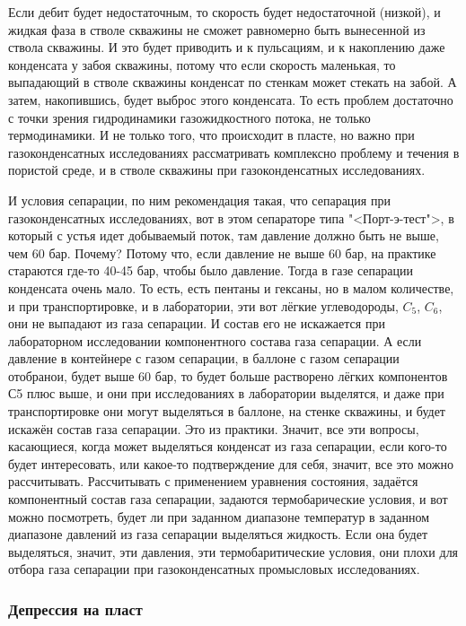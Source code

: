 \documentclass[main.tex]{subfiles}
\begin{document}
Если дебит будет недостаточным, то скорость будет недостаточной (низкой), и жидкая фаза в стволе скважины не сможет равномерно быть вынесенной из ствола скважины.
И это будет приводить и к пульсациям, и к накоплению даже конденсата у забоя скважины, потому что если скорость маленькая, то выпадающий в стволе скважины конденсат по стенкам может стекать на забой.
А затем, накопившись, будет выброс этого конденсата.
То есть проблем достаточно с точки зрения гидродинамики газожидкостного потока, не только термодинамики.
И не только того, что происходит в пласте, но важно при газоконденсатных исследованиях рассматривать комплексно проблему и течения в пористой среде, и в стволе скважины при газоконденсатных исследованиях.

И условия сепарации, по ним рекомендация такая, что сепарация при газоконденсатных исследованиях, вот в этом сепараторе типа "<Порт-э-тест">, в который с устья идет добываемый поток, там давление должно быть не выше, чем 60 бар.
Почему?
Потому что, если давление не выше 60 бар, на практике стараются где-то 40-45 бар, чтобы было давление.
Тогда в газе сепарации конденсата очень мало.
То есть, есть пентаны и гексаны, но в малом количестве, и при транспортировке, и в лаборатории, эти вот лёгкие углеводороды, $C_5$, $C_6$, они не выпадают из газа сепарации.
И состав его не искажается при лабораторном исследовании компонентного состава газа сепарации.
А если давление в контейнере с газом сепарации, в баллоне с газом сепарации отобранои, будет выше 60 бар, то будет больше растворено лёгких компонентов С5 плюс выше, и они при исследованиях в лаборатории выделятся, и даже при транспортировке они могут выделяться в баллоне, на стенке скважины, и будет искажён состав газа сепарации.
Это из практики.
Значит, все эти вопросы, касающиеся, когда может выделяться конденсат из газа сепарации, если кого-то будет интересовать, или какое-то подтверждение для себя, значит, все это можно рассчитывать.
Рассчитывать с применением уравнения состояния, задаётся компонентный состав газа сепарации, задаются термобарические условия, и вот можно посмотреть, будет ли при заданном диапазоне температур в заданном диапазоне давлений из газа сепарации выделяться жидкость.
Если она будет выделяться, значит, эти давления, эти термобаритические условия, они плохи для отбора газа сепарации при газоконденсатных промысловых исследованиях.

\subsubsection{Депрессия на пласт}
\end{document}
